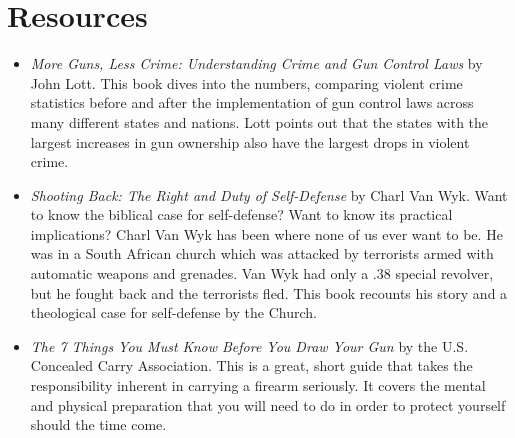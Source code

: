 \section{Resources}
\begin{itemize}
\item 
\textit{More Guns, Less Crime: Understanding Crime and Gun
Control Laws} by John Lott.  This book dives into the numbers,
comparing violent crime statistics before and after the implementation
of gun control laws across many different states and nations.  Lott
points out that the states with the largest increases in gun ownership
also have the largest drops in violent crime.
\item
\textit{Shooting Back: The Right and Duty of Self-Defense} by Charl Van Wyk.
Want to know the biblical case for self-defense?  Want to know its practical
implications?  Charl Van Wyk has been where none of us ever want to be.  He
was in a South African church which was attacked by terrorists armed with
automatic weapons and grenades.   Van Wyk had only a .38 special revolver, but
he fought back and the terrorists fled.  This book recounts his story and a
theological case for self-defense by the Church.
\item
\textit{The 7 Things You Must Know Before You Draw Your Gun} by the 
U.S. Concealed Carry Association.  This is a great, short guide that
takes the responsibility inherent in carrying a firearm seriously.
It covers the mental and physical preparation that you will need to
do in order to protect yourself should the time come.
\end{itemize}
